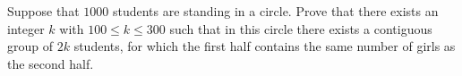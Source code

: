 Suppose that $1000$ students are standing in a circle. Prove that there exists an integer $k$ with $100 \leq k \leq 300$ such that in this circle there exists a contiguous group of $2k$ students, for which the first half contains the same number of girls as the second half.
